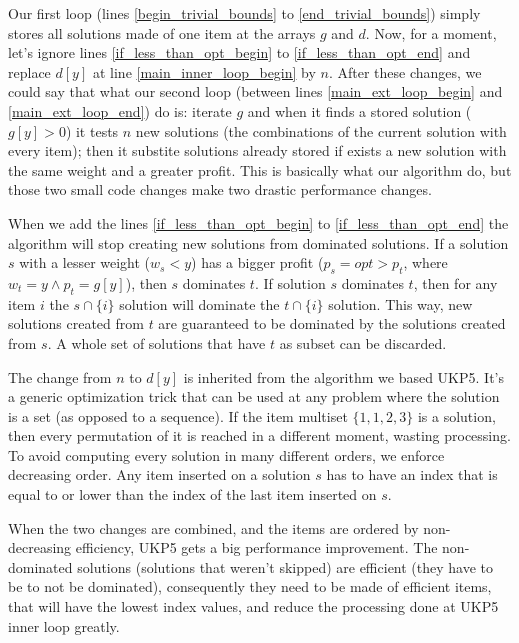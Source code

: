 \documentclass[runningheads,a4paper]{llncs}
\begin{document}
Our first loop (lines \ref{begin_trivial_bounds} to \ref{end_trivial_bounds}) simply stores all solutions made of one item at the arrays \(g\) and \(d\). Now, for a moment, let's ignore lines \ref{if_less_than_opt_begin} to \ref{if_less_than_opt_end} and replace \(d[y]\) at line \ref{main_inner_loop_begin} by \(n\). After these changes, we could say that what our second loop (between lines \ref{main_ext_loop_begin} and \ref{main_ext_loop_end}) do is: iterate \(g\) and when it finds a stored solution (\(g[y] > 0\)) it tests \(n\) new solutions (the combinations of the current solution with every item); then it substite solutions already stored if exists a new solution with the same weight and a greater profit. This is basically what our algorithm do, but those two small code changes make two drastic performance changes.%

When we add the lines \ref{if_less_than_opt_begin} to \ref{if_less_than_opt_end} the algorithm will stop creating new solutions from dominated solutions. If a solution \(s\) with a lesser weight (\(w_s < y\)) has a bigger profit (\(p_s = opt > p_t\), where \(w_t = y \land p_t = g[y]\)), then \(s\) dominates \(t\). If solution \(s\) dominates \(t\), then for any item \(i\) the \(s \cap \{i\}\) solution will dominate the \(t \cap \{i\}\) solution. This way, new solutions created from \(t\) are guaranteed to be dominated by the solutions created from \(s\). A whole set of solutions that have \(t\) as subset can be discarded. 

The change from \(n\) to \(d[y]\) is inherited from the algorithm we based UKP5. It's a generic optimization trick that can be used at any problem where the solution is a set (as opposed to a sequence). If the item multiset \(\{1, 1, 2, 3\}\) is a solution, then every permutation of it is reached in a different moment, wasting processing. To avoid computing every solution in many different orders, we enforce decreasing order. Any item inserted on a solution \(s\) has to have an index that is equal to or lower than the index of the last item inserted on \(s\). 

When the two changes are combined, and the items are ordered by non-decreasing efficiency, UKP5 gets a big performance improvement. The non-dominated solutions (solutions that weren't skipped) are efficient (they have to be to not be dominated), consequently they need to be made of efficient items, that will have the lowest index values, and reduce the processing done at UKP5 inner loop greatly.
\end{document}
